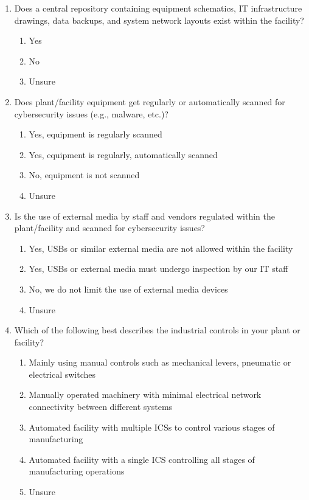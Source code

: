 \documentclass[./main.tex]{subfiles}
\begin{document}
\begin{enumerate}[label=\textbf{Q\arabic*.}]
\item Does a central repository containing equipment schematics, IT infrastructure drawings, data backups, and system network layouts exist within the facility?
\begin{enumerate}
    \item Yes
    \item No
    \item Unsure
\end{enumerate}

\item Does plant/facility equipment get regularly or automatically scanned for cybersecurity issues (e.g., malware, etc.)?
\begin{enumerate}
    \item Yes, equipment is regularly scanned
    \item Yes, equipment is regularly, automatically scanned
    \item No, equipment is not scanned
    \item Unsure
\end{enumerate}

\clearpage

\item Is the use of external media by staff and vendors regulated within the plant/facility and scanned for cybersecurity issues?
\begin{enumerate}
    \item Yes, USBs or similar external media are not allowed within the facility
    \item Yes, USBs or external media must undergo inspection by our IT staff
    \item No, we do not limit the use of external media devices
    \item Unsure
\end{enumerate}



\item Which of the following best describes the industrial controls in your plant or facility?
\begin{enumerate}
    \item Mainly using manual controls such as mechanical levers, pneumatic or electrical switches
    \item Manually operated machinery with minimal electrical network connectivity between different systems
    \item Automated facility with multiple ICSs to control various stages of manufacturing
    \item Automated facility with a single ICS controlling all stages of manufacturing operations
    \item Unsure
\end{enumerate}


\end{enumerate}
\end{document}
